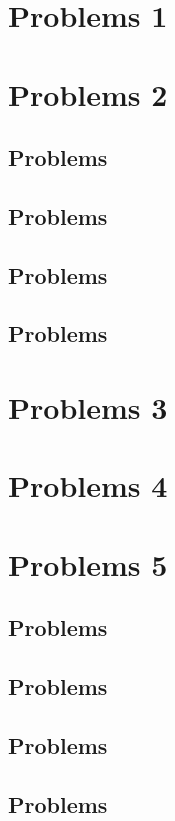 \documentclass[12pt,a4paper]{article}
\theoremstyle{definition}
\begin{document}
\section{Problems 1}
\section{Problems 2}
\subsection{Problems}

\subsection{Problems}

\subsection{Problems}

\subsection{Problems}

\section{Problems 3}
\section{Problems 4}
\section{Problems 5}
\subsection{Problems}

\subsection{Problems}

\subsection{Problems}

\subsection{Problems}

\end{document}
